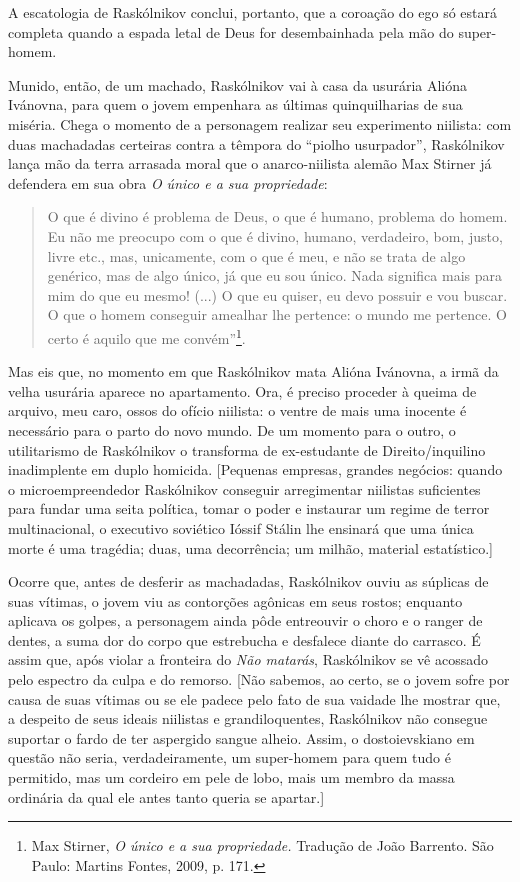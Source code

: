 A escatologia de Raskólnikov conclui, portanto, que a coroação do ego só
estará completa quando a espada letal de Deus for desembainhada pela mão
do super-homem.

Munido, então, de um machado, Raskólnikov vai à casa da usurária Alióna
Ivánovna, para quem o jovem empenhara as últimas quinquilharias de sua
miséria. Chega o momento de a personagem realizar seu experimento
niilista: com duas machadadas certeiras contra a têmpora do ``piolho
usurpador'', Raskólnikov lança mão da terra arrasada moral que o
anarco-niilista alemão Max Stirner já defendera em sua obra \emph{O
único e a sua propriedade}:

\begin{quote}
O que é divino é problema de Deus, o que é humano, problema do homem. Eu
não me preocupo com o que é divino, humano, verdadeiro, bom, justo,
livre etc., mas, unicamente, com o que é meu, e não se trata de algo
genérico, mas de algo único, já que eu sou único. Nada significa mais
para mim do que eu mesmo! (...) O que eu quiser, eu devo possuir e vou
buscar. O que o homem conseguir amealhar lhe pertence: o mundo me
pertence. O certo é aquilo que me convém''\footnote{Max Stirner, \emph{O
  único e a sua propriedade.} Tradução de João Barrento. São Paulo:
  Martins Fontes, 2009, p. 171.}.
\end{quote}

Mas eis que, no momento em que Raskólnikov mata Alióna Ivánovna, a irmã
da velha usurária aparece no apartamento. Ora, é preciso proceder à
queima de arquivo, meu caro, ossos do ofício niilista: o ventre de mais
uma inocente é necessário para o parto do novo mundo. De um momento para
o outro, o utilitarismo de Raskólnikov o transforma de ex-estudante de
Direito/inquilino inadimplente em duplo homicida. {[}Pequenas empresas,
grandes negócios: quando o microempreendedor Raskólnikov conseguir
arregimentar niilistas suficientes para fundar uma seita política, tomar
o poder e instaurar um regime de terror multinacional, o executivo
soviético Ióssif Stálin lhe ensinará que uma única morte é uma tragédia;
duas, uma decorrência; um milhão, material estatístico.{]}

Ocorre que, antes de desferir as machadadas, Raskólnikov ouviu as
súplicas de suas vítimas, o jovem viu as contorções agônicas em seus
rostos; enquanto aplicava os golpes, a personagem ainda pôde entreouvir
o choro e o ranger de dentes, a suma dor do corpo que estrebucha e
desfalece diante do carrasco. É assim que, após violar a fronteira do
\emph{Não matarás}, Raskólnikov se vê acossado pelo espectro da culpa e
do remorso. {[}Não sabemos, ao certo, se o jovem sofre por causa de suas
vítimas ou se ele padece pelo fato de sua vaidade lhe mostrar que, a
despeito de seus ideais niilistas e grandiloquentes, Raskólnikov não
consegue suportar o fardo de ter aspergido sangue alheio. Assim, o
dostoievskiano em questão não seria, verdadeiramente, um super-homem
para quem tudo é permitido, mas um cordeiro em pele de lobo, mais um
membro da massa ordinária da qual ele antes tanto queria se apartar.{]}

